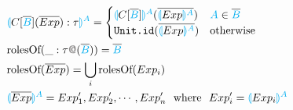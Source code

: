 \documentclass[11pt]{jarticle}
\newcommand{\projection}[2]{{\color{cyan}\llparenthesis}#1{\color{cyan}\rrparenthesis^#2}}
\newcommand{\gray}[1]{\textbf{\textsf{\color{Gray}#1}}}
\begin{document}
\begin{alignat*}{2}
  &&&\projection{C[\overline{\color{cyan}B}](\overline{Exp}):\tau}{A}=
  \begin{cases}
    \projection{C[\overline{\color{cyan}B}]}{A} (\overline{\projection{Exp}{A}}) & {\color{cyan}A} \in \overline{\color{cyan}B}\\
    \texttt{Unit.id}(\overline{\projection{Exp}{A}}) &\text{otherwise}
  \end{cases}\\
  &&&\text{rolesOf}(\_:\tau\gray{@}(\overline{\color{cyan}B})) = {\overline{\color{cyan}B}}\\
  &&&\text{rolesOf}(\overline{Exp}) = \bigcup_i \text{rolesOf}(Exp_i) \\
  &&&\projection{\overline{Exp}}{A} = Exp'_1,Exp'_2,\cdots,Exp'_n ~~\text{where}~~ Exp'_i = \projection{Exp_i}{A}\\  
\end{alignat*}
\end{document}
